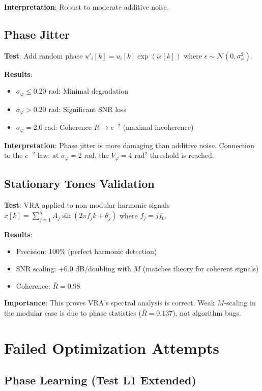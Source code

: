 \documentclass[10pt,twocolumn]{article}
\begin{document}
\textbf{Interpretation}: Robust to moderate additive noise.

\subsection{Phase Jitter}

\textbf{Test}: Add random phase $u'_i[k] = u_i[k] \exp(i\epsilon[k])$ where $\epsilon \sim \mathcal{N}(0, \sigma_\varphi^2)$.

\textbf{Results}:
\begin{itemize}
\item $\sigma_\varphi \le 0.20$ rad: Minimal degradation
\item $\sigma_\varphi > 0.20$ rad: Significant SNR loss
\item $\sigma_\varphi = 2.0$ rad: Coherence $\bar{R} \to e^{-2}$ (maximal incoherence)
\end{itemize}

\textbf{Interpretation}: Phase jitter is more damaging than additive noise. Connection to the $e^{-2}$ law: at $\sigma_\varphi = 2$ rad, the $V_\varphi = 4$ rad$^2$ threshold is reached.

\subsection{Stationary Tones Validation}

\textbf{Test}: VRA applied to non-modular harmonic signals $x[k] = \sum_{j=1}^5 A_j \sin(2\pi f_j k + \theta_j)$ where $f_j = j f_0$.

\textbf{Results}:
\begin{itemize}
\item Precision: 100\% (perfect harmonic detection)
\item SNR scaling: +6.0 dB/doubling with $M$ (matches theory for coherent signals)
\item Coherence: $\bar{R} = 0.98$
\end{itemize}

\textbf{Importance}: This proves VRA's spectral analysis is correct. Weak $M$-scaling in the modular case is due to phase statistics ($\bar{R} = 0.137$), not algorithm bugs.

\section{Failed Optimization Attempts}

\subsection{Phase Learning (Test L1 Extended)}
\end{document}
